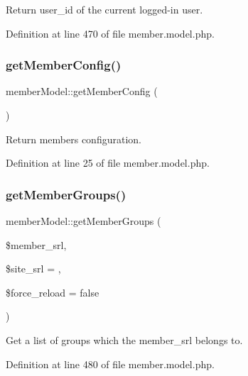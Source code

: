 Return user\+\_\+id of the current logged-\/in user. 



Definition at line 470 of file member.\+model.\+php.

\hypertarget{classmemberModel_a063f34e0a57f8e1c2737318ecd6db8c7}{}\label{classmemberModel_a063f34e0a57f8e1c2737318ecd6db8c7} 
\subsubsection{\texorpdfstring{get\+Member\+Config()}{getMemberConfig()}}
{\footnotesize\ttfamily member\+Model\+::get\+Member\+Config (\begin{DoxyParamCaption}{ }\end{DoxyParamCaption})}



Return member\textquotesingle{}s configuration. 



Definition at line 25 of file member.\+model.\+php.

\hypertarget{classmemberModel_a0e6c68ca86056aaa63a5171704df8367}{}\label{classmemberModel_a0e6c68ca86056aaa63a5171704df8367} 
\subsubsection{\texorpdfstring{get\+Member\+Groups()}{getMemberGroups()}}
{\footnotesize\ttfamily member\+Model\+::get\+Member\+Groups (\begin{DoxyParamCaption}\item[{}]{\$member\+\_\+srl,  }\item[{}]{\$site\+\_\+srl = {},  }\item[{}]{\$force\+\_\+reload = {\ttfamily false} }\end{DoxyParamCaption})}



Get a list of groups which the member\+\_\+srl belongs to. 



Definition at line 480 of file member.\+model.\+php.

\hypertarget{classmemberModel_a24c934744cc3cc540533312463a63026}{}\label{classmemberModel_a24c934744cc3cc540533312463a63026} 
